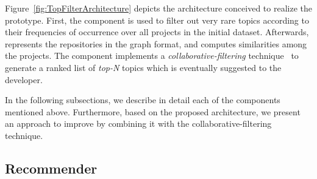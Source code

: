 Figure~\ref{fig:TopFilterArchitecture} depicts the architecture conceived to realize the \TF prototype. %
First, the  component is used to filter out very rare topics according to their frequencies of occurrence over all projects in the initial dataset. Afterwards,  represents the repositories in the graph format, and  computes similarities among the projects. The  component implements a \emph{collaborative-filtering} technique~\cite{Aggarwal2016,Zhao:2010:UCR:1748610.1749278,NGUYEN2020110460} %
to generate a ranked list of \emph{top-N} topics which %
is eventually suggested to the developer.


In the following subsections, we describe in detail each of the components mentioned above. %
Furthermore, based on the proposed architecture, we present an approach to improve \MNB by combining it with the collaborative-filtering technique. %





\subsection{Recommender}




